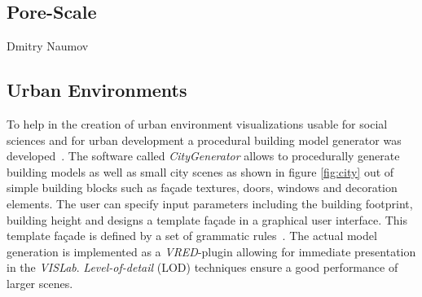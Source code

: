 \documentclass[twocolumn]{svjour3}          %
\begin{document}
\subsection{Pore-Scale}
\label{pore-scale}

Dmitry Naumov

\subsection{Urban Environments}
\label{urban-environments}


To help in the creation of urban environment visualizations usable for social sciences and for urban development a procedural\cite{procedural:modelling} building model generator was developed~\cite{bilke:master}. The software called \emph{CityGenerator} allows to procedurally generate building models as well as small city scenes as shown in figure \ref{fig:city} out of simple building blocks such as fa\c{c}ade textures, doors, windows and decoration elements. The user can specify input parameters including the building footprint, building height and designs a template fa\c{c}ade in a graphical user interface. This template fa\c{c}ade is defined by a set of grammatic rules~\cite{procedural:buildings}. The actual model generation is implemented as a \emph{VRED}-plugin allowing for immediate presentation in the \emph{VISLab}. \emph{Level-of-detail} (LOD) techniques ensure a good performance of larger scenes.
\end{document}
